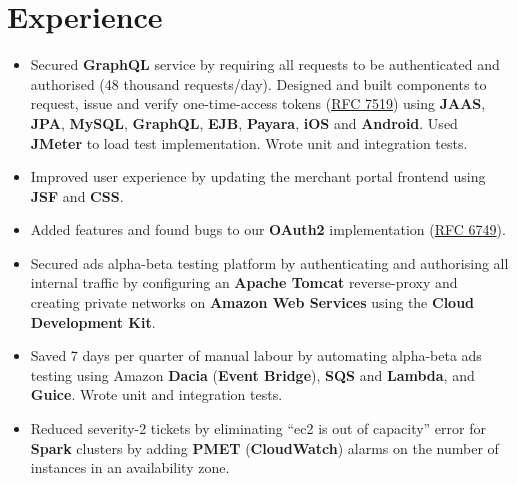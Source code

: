 \section{Experience}

\begin{itemize}[leftmargin=*]
    \item {
        Secured \textbf{GraphQL} service by requiring all requests to be authenticated and authorised (48 thousand requests/day). Designed and built components to request, issue and verify one-time-access tokens (\href{https://datatracker.ietf.org/doc/html/rfc7519}{RFC 7519}) using \textbf{JAAS}, \textbf{JPA}, \textbf{MySQL}, \textbf{GraphQL}, \textbf{EJB}, \textbf{Payara}, \textbf{iOS} and \textbf{Android}. Used \textbf{JMeter} to load test implementation. Wrote unit and integration tests.
    }
    \item {
        Improved user experience by updating the merchant portal frontend using \textbf{JSF} and \textbf{CSS}.
    }
    \item {
        Added features and found bugs to our \textbf{OAuth2} implementation (\href{https://datatracker.ietf.org/doc/html/rfc6749}{RFC 6749}).
    }
\end{itemize}


\begin{itemize}[leftmargin=*]
    \item {
        Secured ads alpha-beta testing platform by authenticating and authorising all internal traffic by configuring an \textbf{Apache Tomcat} reverse-proxy and creating private networks on \textbf{Amazon Web Services} using the \textbf{Cloud Development Kit}.
    }
    \item {
        Saved 7 days per quarter of manual labour by automating alpha-beta ads testing using Amazon \textbf{Dacia} (\textbf{Event Bridge}), \textbf{SQS} and \textbf{Lambda}, and \textbf{Guice}. Wrote unit and integration tests.
    }
    \item {
        Reduced severity-2 tickets by eliminating “ec2 is out of capacity” error for \textbf{Spark} clusters by adding \textbf{PMET} (\textbf{CloudWatch}) alarms on the number of instances in an availability zone.
    }
\end{itemize}

